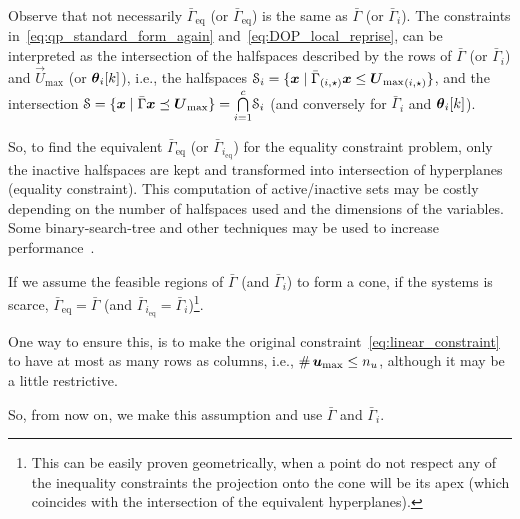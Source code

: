 \documentclass[../main.tex]{subfiles}
\begin{document}
\begin{remark}
  Observe that not necessarily $\bar{\Gamma}_{\text{eq}}$ (or $\bar{\Gamma}_{\text{eq}}$) is the same as $\bar{\Gamma}$ (or $\bar{\Gamma}_{i}$).
  The constraints in~\eqref{eq:qp_standard_form_again} and~\eqref{eq:DOP_local_reprise}, can be interpreted as the intersection of the halfspaces described by the rows of $\bar{\Gamma}$ (or $\bar{\Gamma}_{i}$) and $\vec{U}_{\max}$ (or $\thetaik$), i.e., the halfspaces
  ${\set{S}_i=\setbuild{\vec{x}}{\elem[i,\star]{{\bar{\Gamma}}}\vec{x}\leq\elem[i,\star]{\vec{U}_{\max}}}}$,
  and the intersection
  ${\set{S}=\setbuild{\vec{x}}{\bar{\Gamma}\vec{x}\preceq\vec{U}_{\max}}=\bigcap\limits_{i=1}^{c}}\set{S}_{i}$
  (and conversely for $\bar{\Gamma}_{i}$ and $\thetaik$).

  So, to find the equivalent $\bar{\Gamma}_{\text{eq}}$ (or $\bar{\Gamma}_{i_{\text{eq}}}$) for the equality constraint problem, only the inactive halfspaces are kept and transformed into intersection of hyperplanes (equality constraint).
  This computation of active/inactive sets may be costly depending on the number of halfspaces used and the dimensions of the variables.
  Some binary-search-tree and other techniques may be used to increase performance~\cite{SchulzeEtAl2022,AlessioBemporad2009}.

  If we assume the feasible regions of $\bar{\Gamma}$ (and $\bar{\Gamma}_{i}$) to form a cone, if the systems is scarce, $\bar{\Gamma}_{\text{eq}}=\bar{\Gamma}$ (and $\bar{\Gamma}_{i_\text{eq}}=\bar{\Gamma}_i$)\footnote{This can be easily proven geometrically, when a point do not respect any of the inequality constraints the projection onto the cone will be its apex (which coincides with the intersection of the equivalent hyperplanes).}.

One way to ensure this, is to make the original constraint~\eqref{eq:linear_constraint} to have at most as many rows as columns, i.e., $\card{\vec{u}_{\max}}\leq n_{u}$, although it may be a little restrictive.

So, from now on, we make this assumption and use $\bar{\Gamma}$ and $\bar{\Gamma}_{i}$.

\end{remark}
\end{document}
